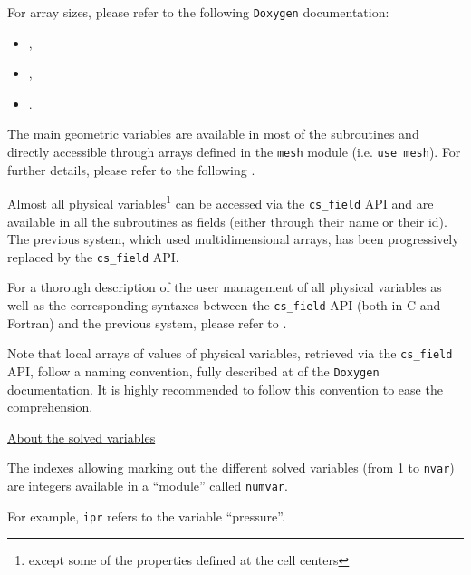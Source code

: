 {{{{For array sizes, please refer to the following \texttt{Doxygen} documentation:
\begin{itemize}
\item {},
\item {},
\item {}.
\end{itemize}


The main geometric variables are available in most of the
subroutines and directly accessible through arrays defined
in the \texttt{mesh} module (i.e. \texttt{use mesh}). For
further details, please refer to the following
.


Almost all physical variables\footnote{except some of the properties defined at
the cell centers} can be accessed via the \texttt{cs\_field} API and are
available in all the subroutines as fields (either through their name or their
id). The previous system, which used multidimensional arrays, has been
progressively replaced by the \texttt{cs\_field} API.

For a thorough description of the user management of all physical
variables as well as the corresponding syntaxes between the \texttt{cs\_field}
API (both in C and Fortran) and the previous system, please refer to
.

Note that local arrays of values of physical variables, retrieved via the
\texttt{cs\_field} API, follow a naming convention, fully described at
 of the \texttt{Doxygen} documentation. It
is highly recommended to follow this convention to ease the comprehension.

\underline{About the solved variables}

The indexes allowing marking out the different solved variables (from 1 to
\texttt{nvar}) are integers available in a ``module'' called
\texttt{numvar}.

For example, \texttt{ipr} refers to the variable ``pressure''.

}}}}
